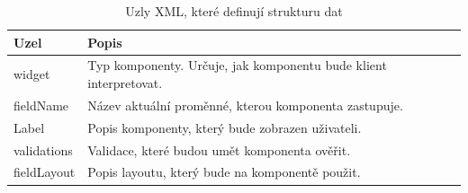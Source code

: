 \begin{table}[width=\linewidth]
\begin{center}
\caption{Uzly XML, které definují strukturu dat}
\label{table:xmlComponentAttributes}
\begin{tabular}{|p{7cm}|p{7cm}|}
\hline
\textbf{Uzel} & \textbf{Popis} \\
\hline
widget & 
Typ komponenty. Určuje, jak komponentu bude klient interpretovat. \\
\hline
fieldName &
Název aktuální proměnné, kterou komponenta zastupuje. \\
\hline
Label &
Popis komponenty, který bude zobrazen uživateli. \\
\hline
validations &
Validace, které budou umět komponenta ověřit. \\
\hline
fieldLayout&
Popis layoutu, který bude na komponentě použit. \\
\hline
\end{tabular}
\end{center}
\end{table}

